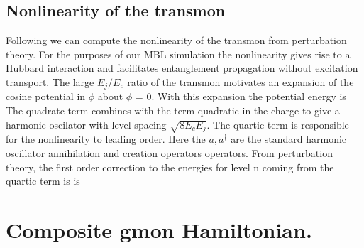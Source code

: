 \subsection{Nonlinearity of the transmon}
Following \cite{Koch2007, JimmyThesis} we can compute the nonlinearity of the transmon from perturbation theory.
For the purposes of our MBL simulation the nonlinearity gives rise to a Hubbard interaction and facilitates entanglement propagation without excitation transport.
The large $E_j / E_c$ ratio of the transmon motivates an expansion of the cosine potential in $\phi$ about $\phi$ = 0.
With this expansion the potential energy is
The quadratc term combines with the term quadratic in the charge to give a harmonic oscilator with level spacing $\sqrt{8 E_cE_j}$.
The quartic term is responsible for the nonlinearity to leading order.
Here the $a,a^\dagger$ are the standard harmonic oscillator annihilation and creation operators operators.
From perturbation theory, the first order correction to the energies for level n coming from the quartic term is is


\section{Composite gmon Hamiltonian.}


